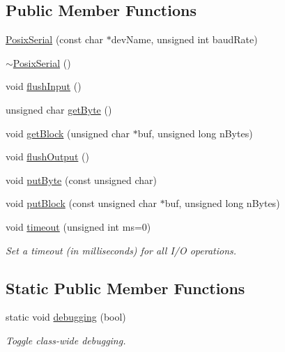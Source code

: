 \subsection*{\-Public \-Member \-Functions}
\begin{DoxyCompactItemize}
\item 
\hyperlink{classmetrobotics_1_1PosixSerial_ac44cdb1af876e80ddfdbeb042d65debc}{\-Posix\-Serial} (const char $\ast$dev\-Name, unsigned int baud\-Rate)
\item 
\hyperlink{classmetrobotics_1_1PosixSerial_a46a1dca8714afcf0b5ec9498b02dd5a8}{$\sim$\-Posix\-Serial} ()
\item 
void \hyperlink{classmetrobotics_1_1PosixSerial_aa0a3298fc067b03e62154ccbe6bd276e}{flush\-Input} ()
\item 
unsigned char \hyperlink{classmetrobotics_1_1PosixSerial_aeeacb8383b543a5354b8663254205727}{get\-Byte} ()
\item 
void \hyperlink{classmetrobotics_1_1PosixSerial_a3174f9e2382efbbc53795565314e6030}{get\-Block} (unsigned char $\ast$buf, unsigned long n\-Bytes)
\item 
void \hyperlink{classmetrobotics_1_1PosixSerial_a44eb4e702e0c08f3f354e9c19e9cef8a}{flush\-Output} ()
\item 
void \hyperlink{classmetrobotics_1_1PosixSerial_ac77d22c91d44f80782e8c6f2a5070f52}{put\-Byte} (const unsigned char)
\item 
void \hyperlink{classmetrobotics_1_1PosixSerial_abc2a8fd6b268ea5993590d099ad6ba80}{put\-Block} (const unsigned char $\ast$buf, unsigned long n\-Bytes)
\item 
void \hyperlink{classmetrobotics_1_1PosixSerial_a7650234ceea8ddb92e35be4f4811bd63}{timeout} (unsigned int ms=0)
\begin{DoxyCompactList}\small\item\em \-Set a timeout (in milliseconds) for all \-I/\-O operations. \end{DoxyCompactList}\end{DoxyCompactItemize}
\subsection*{\-Static \-Public \-Member \-Functions}
\begin{DoxyCompactItemize}
\item 
static void \hyperlink{classmetrobotics_1_1PosixSerial_a6a790d35488736c052dc580baf2a6391}{debugging} (bool)
\begin{DoxyCompactList}\small\item\em \-Toggle class-\/wide debugging. \end{DoxyCompactList}\end{DoxyCompactItemize}
